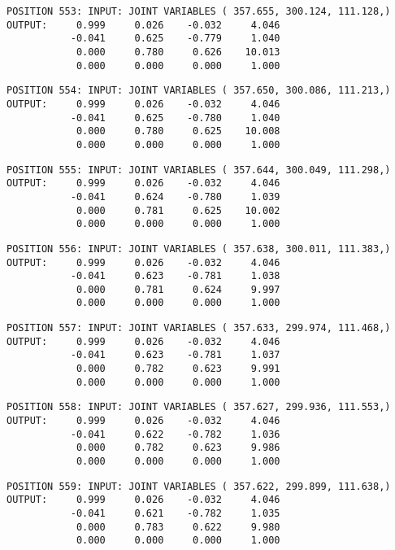 \begin{verbatim}
POSITION 553: INPUT: JOINT VARIABLES ( 357.655, 300.124, 111.128,)
OUTPUT:     0.999     0.026    -0.032     4.046
           -0.041     0.625    -0.779     1.040
            0.000     0.780     0.626    10.013
            0.000     0.000     0.000     1.000
\end{verbatim} \pagebreak[1]\begin{verbatim}
POSITION 554: INPUT: JOINT VARIABLES ( 357.650, 300.086, 111.213,)
OUTPUT:     0.999     0.026    -0.032     4.046
           -0.041     0.625    -0.780     1.040
            0.000     0.780     0.625    10.008
            0.000     0.000     0.000     1.000
\end{verbatim} \pagebreak[1]\begin{verbatim}
POSITION 555: INPUT: JOINT VARIABLES ( 357.644, 300.049, 111.298,)
OUTPUT:     0.999     0.026    -0.032     4.046
           -0.041     0.624    -0.780     1.039
            0.000     0.781     0.625    10.002
            0.000     0.000     0.000     1.000
\end{verbatim} \pagebreak[1]\begin{verbatim}
POSITION 556: INPUT: JOINT VARIABLES ( 357.638, 300.011, 111.383,)
OUTPUT:     0.999     0.026    -0.032     4.046
           -0.041     0.623    -0.781     1.038
            0.000     0.781     0.624     9.997
            0.000     0.000     0.000     1.000
\end{verbatim} \pagebreak[1]\begin{verbatim}
POSITION 557: INPUT: JOINT VARIABLES ( 357.633, 299.974, 111.468,)
OUTPUT:     0.999     0.026    -0.032     4.046
           -0.041     0.623    -0.781     1.037
            0.000     0.782     0.623     9.991
            0.000     0.000     0.000     1.000
\end{verbatim} \pagebreak[1]\begin{verbatim}
POSITION 558: INPUT: JOINT VARIABLES ( 357.627, 299.936, 111.553,)
OUTPUT:     0.999     0.026    -0.032     4.046
           -0.041     0.622    -0.782     1.036
            0.000     0.782     0.623     9.986
            0.000     0.000     0.000     1.000
\end{verbatim} \pagebreak[1]\begin{verbatim}
POSITION 559: INPUT: JOINT VARIABLES ( 357.622, 299.899, 111.638,)
OUTPUT:     0.999     0.026    -0.032     4.046
           -0.041     0.621    -0.782     1.035
            0.000     0.783     0.622     9.980
            0.000     0.000     0.000     1.000
\end{verbatim} \pagebreak[1]\begin{verbatim}

\end{verbatim}
